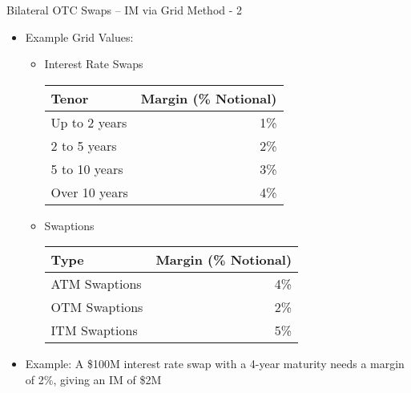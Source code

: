 \documentclass[handout, aspectratio=169]{beamer}
\begin{document}
\begin{frame}{Bilateral OTC Swaps – IM via Grid Method - 2}
  \begin{itemize}
    \item Example Grid Values:
      \begin{itemize}
        \item Interest Rate Swaps
          \begin{center}
            \begin{tabular}{l r}
              \textbf{Tenor} & \textbf{Margin (\% Notional)} \\
              \hline
              Up to 2 years & 1\% \\
              2 to 5 years  & 2\% \\
              5 to 10 years & 3\% \\
              Over 10 years & 4\%
            \end{tabular}
          \end{center}
        \item Swaptions
          \begin{center}
            \begin{tabular}{l r}
              \textbf{Type} & \textbf{Margin (\% Notional)} \\
              \hline
              ATM Swaptions & 4\% \\
              OTM Swaptions & 2\% \\
              ITM Swaptions & 5\%
            \end{tabular}
          \end{center}
      \end{itemize}
    \item Example: A \$100M interest rate swap with a 4-year maturity needs a margin of 2\%, giving an IM of \$2M
  \end{itemize}
\end{frame}
\end{document}
